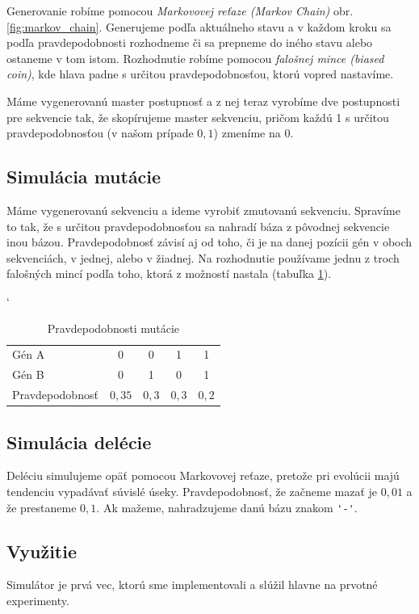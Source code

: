 Generovanie robíme pomocou \textit{Markovovej reťaze (Markov Chain)} obr. \ref{fig:markov_chain}. Generujeme podľa aktuálneho stavu a v každom kroku sa podľa pravdepodobnosti rozhodneme či sa prepneme do iného stavu alebo ostaneme v tom istom. Rozhodnutie robíme pomocou \textit{falošnej mince (biased coin)}, kde hlava padne s určitou pravdepodobnosťou, ktorú vopred nastavíme.


Máme vygenerovanú master postupnosť a z nej teraz vyrobíme dve postupnosti pre sekvencie tak, že skopírujeme master sekvenciu, pričom každú 1 s určitou pravdepodobnosťou (v našom prípade $0,1$) zmeníme na 0.

\subsection{Simulácia mutácie}

Máme vygenerovanú sekvenciu a ideme vyrobiť zmutovanú sekvenciu. Spravíme to tak, že s určitou pravdepodobnosťou sa nahradí báza z pôvodnej sekvencie inou bázou. Pravdepodobnosť závisí aj od toho, či je na danej pozícii gén v oboch sekvenciách, v jednej, alebo v žiadnej. Na rozhodnutie používame jednu z troch falošných mincí podľa toho, ktorá z možností nastala (tabuľka \ref{tab:mutation_prob}).

\begin{table}[h]
\catcode` %
\centering
\begin{tabular}{lcccc}
Gén A & 0 & 0 & 1 & 1\\
Gén B & 0 & 1 & 0 & 1\\
Pravdepodobnosť & $0,35$ & $0,3$ & $0,3$ & $0,2$\\
\end{tabular}
\caption{Pravdepodobnosti mutácie}
\label{tab:mutation_prob}
\end{table}

\subsection{Simulácia delécie}
Deléciu simulujeme opäť pomocou Markovovej reťaze, pretože pri evolúcii majú tendenciu vypadávať súvislé úseky. Pravdepodobnosť, že začneme mazať je $0,01$ a že prestaneme $0,1$.
Ak mažeme, nahradzujeme danú bázu znakom {\verb+'-'+}. 

\subsection{Využitie}

Simulátor je prvá vec, ktorú sme implementovali a slúžil hlavne na prvotné experimenty.
